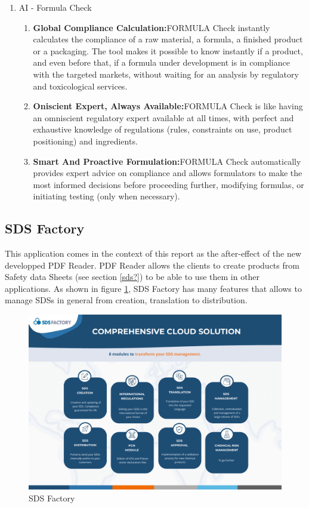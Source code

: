 \documentclass[a4paper,12pt,twoside]{report}
\begin{document}
\begin{enumerate}
\begin{enumerate}
\begin{itemize}
	\end{itemize}	
	\end{enumerate}
\item AI - Formula Check
	\begin{enumerate}
		\item \textbf{Global Compliance Calculation:}FORMULA Check instantly calculates the compliance of a raw 
material, a formula, a finished product or a packaging. The tool 
makes it possible to know instantly if a product, and even before that, if 
a formula under development is in compliance with the targeted 
markets, without waiting for an analysis by regulatory and toxicological 
services.
		\item \textbf{Oniscient Expert, Always Available:}FORMULA Check is like having an omniscient regulatory expert 
available at all times, with perfect and exhaustive knowledge of 
regulations (rules, constraints on use, product positioning) and 
ingredients.

		\item \textbf{Smart And Proactive Formulation:}FORMULA Check automatically provides expert advice on 
compliance and allows formulators to make the most informed 
decisions before proceeding further, modifying formulas, or initiating 
testing (only when necessary).
	\end{enumerate}
\end{enumerate}



\subsection{SDS Factory}
This application comes in the context of this report as the after-effect of the new developped PDF Reader. PDF Reader allows the clients to create products from Safety data Sheets (see  section \ref{sds?}) to be able to use them in other applications. As shown in figure \ref{sdsfactory}, SDS Factory has many features that allows to manage SDSs in general from creation, translation to distribution.
\begin{figure}[H]
		\includegraphics[width=\textwidth]{images/sdsFactory}
	\caption[SDS Factory]{SDS Factory}
	\label{sdsfactory}
\end{figure}
\end{document}
